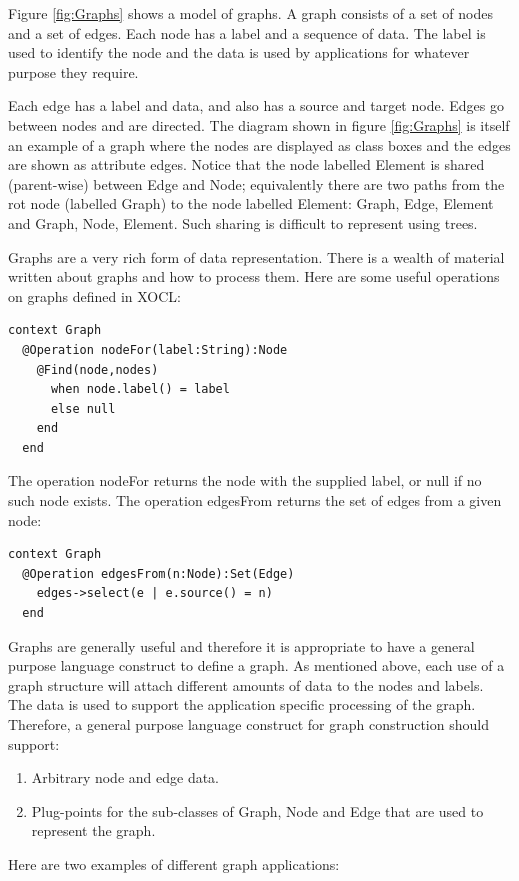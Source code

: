 Figure \ref{fig:Graphs} shows a model of graphs. A graph consists
of a set of nodes and a set of edges. Each node has a label and a
sequence of data. The label is used to identify the node and the data
is used by applications for whatever purpose they require.

Each edge has a label and data, and also has a source and target node.
Edges go between nodes and are directed. The diagram shown in figure
\ref{fig:Graphs} is itself an example of a graph where the nodes
are displayed as class boxes and the edges are shown as attribute
edges. Notice that the node labelled Element is shared (parent-wise)
between Edge and Node; equivalently there are two paths from the rot
node (labelled Graph) to the node labelled Element: Graph, Edge, Element
and Graph, Node, Element. Such sharing is difficult to represent using
trees.

Graphs are a very rich form of data representation. There is a wealth
of material written about graphs and how to process them. Here are
some useful operations on graphs defined in XOCL:

\begin{lstlisting}
context Graph
  @Operation nodeFor(label:String):Node
    @Find(node,nodes)
      when node.label() = label
      else null
    end
  end
\end{lstlisting}The operation nodeFor returns the node with the supplied label, or
null if no such node exists. The operation edgesFrom returns the set
of edges from a given node:

\begin{lstlisting}
context Graph
  @Operation edgesFrom(n:Node):Set(Edge)
    edges->select(e | e.source() = n)
  end
\end{lstlisting}Graphs are generally useful and therefore it is appropriate to have
a general purpose language construct to define a graph. As mentioned
above, each use of a graph structure will attach different amounts
of data to the nodes and labels. The data is used to support the application
specific processing of the graph. Therefore, a general purpose language
construct for graph construction should support:

\begin{enumerate}
\item Arbitrary node and edge data.
\item Plug-points for the sub-classes of Graph, Node and Edge that are used
to represent the graph.
\end{enumerate}
Here are two examples of different graph applications:

